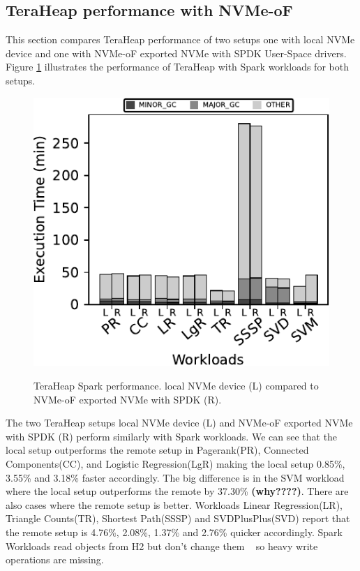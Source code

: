 \subsection{TeraHeap performance with NVMe-oF}
\par This section compares TeraHeap performance of two setups one with local NVMe device and one with NVMe-oF exported NVMe with SPDK User-Space drivers. Figure \ref{fig:bench_spark} illustrates the performance of TeraHeap with Spark workloads for both setups. 
\begin{figure}[H]
  \includegraphics[width=\linewidth]{figures/bench_spark.pdf}\\
\caption{TeraHeap Spark performance. local NVMe device (L) compared to NVMe-oF exported NVMe with SPDK (R).}
\label{fig:bench_spark}
\end{figure}
The two TeraHeap setups local NVMe device (L) and NVMe-oF exported NVMe with
SPDK (R) perform similarly with Spark workloads. We can see that the local setup
outperforms the remote setup in Pagerank(PR), Connected Components(CC), and
Logistic Regression(LgR) making the local setup 0.85\%, 3.55\% and 3.18\% faster
accordingly. The big difference is in the SVM workload where the local setup
outperforms the remote by 37.30\% \textbf{(why????)}. There are also cases where
the remote setup is better. Workloads Linear Regression(LR), Triangle
Counts(TR), Shortest Path(SSSP) and SVDPlusPlus(SVD) report that the remote
setup is 4.76\%, 2.08\%, 1.37\% and 2.76\% quicker accordingly. Spark Workloads
read objects from H2 but don't change them  ~\cite{spark,teraheap} so heavy
write operations are missing.

